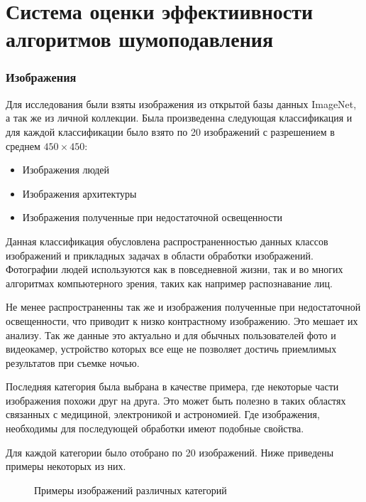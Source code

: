 \section{Система оценки эффектиивности алгоритмов шумоподавления}
\subsubsection{Изображения}
Для исследования были взяты изображения из открытой базы данных ImageNet, а так же из личной коллекции.  Была произведенна следующая классификация и для каждой классификации было взято по 20 изображений с разрешением в среднем $450 \times 450$:
\begin{itemize}
	\item Изображения людей
	\item Изображения архитектуры
	\item Изображения полученные при недостаточной освещенности
\end{itemize}
Данная классификация обусловлена распространенностью данных классов изображений и прикладных задачах в области обработки изображений. Фотографии людей используются как в повседневной жизни, так и во многих алгоритмах компьютерного зрения, таких как например распознавание лиц.

Не менее распространенны так же и изображения полученные при недостаточной освещенности, что приводит к низко контрастному изображению. Это мешает их анализу. Так же данные это актуально и для обычных пользователей фото и видеокамер, устройство которых все еще не позволяет достичь приемлимых результатов при съемке ночью. 

Последняя категория была выбрана в качестве примера, где  некоторые части изображения похожи друг на друга. Это может быть полезно в таких областях связанных с медициной, электроникой и астрономией. Где изображения, необходимы для последующей обработки имеют подобные свойства.

Для каждой категории было отобрано по 20 изображений. Ниже приведены примеры некоторых из них.

\begin{figure}[H]
	\begin{minipage}[H]{0.49\linewidth}
	\end{minipage}
	\begin{minipage}[H]{0.49\linewidth}
	\end{minipage}
	\begin{center}
		\begin{minipage}[H]{0.49\linewidth}
		\end{minipage}
	\end{center}
	\caption{Примеры изображений различных категорий}
\end{figure}


